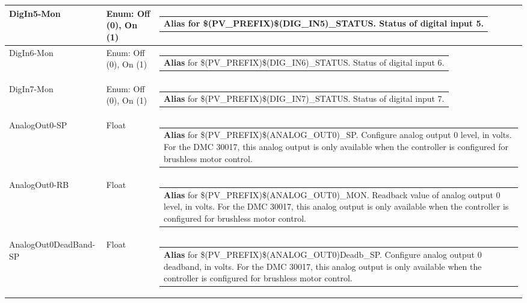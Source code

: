 \documentclass[openany]{article}
\begin{document}
\begin{longtable}{| m{4.5cm} m{2.5cm}  m{8.5cm} |}
        DigIn5-Mon & Enum: Off (0), On (1) & \begin{tabular}{@{}m{6cm}@{}}
                \textbf{\color{blue} Alias} for \$(PV\_PREFIX)\$(DIG\_IN5)\_STATUS. Status of digital input 5.
            \end{tabular} \hypertarget{pv:dig-in-6}{}\\ \hline
        DigIn6-Mon & Enum: Off (0), On (1) & \begin{tabular}{@{}m{6cm}@{}}
                \textbf{\color{blue} Alias} for \$(PV\_PREFIX)\$(DIG\_IN6)\_STATUS. Status of digital input 6.
            \end{tabular} \hypertarget{pv:dig-in-7}{}\\ \hline
        DigIn7-Mon & Enum: Off (0), On (1) & \begin{tabular}{@{}m{6cm}@{}}
                \textbf{\color{blue} Alias} for \$(PV\_PREFIX)\$(DIG\_IN7)\_STATUS. Status of digital input 7.
            \end{tabular} \hypertarget{pv:analog-out-0}{}\\ \hline
        AnalogOut0-SP & Float & \begin{tabular}{@{}m{6cm}@{}}
                \textbf{\color{blue} Alias} for \$(PV\_PREFIX)\$(ANALOG\_OUT0)\_SP. Configure analog output 0 level, in volts. For the DMC 30017, this analog output is only available when the controller is configured for brushless motor control.
            \end{tabular} \hypertarget{}{}\\ \hline
        AnalogOut0-RB & Float & \begin{tabular}{@{}m{6cm}@{}}
                \textbf{\color{blue} Alias} for \$(PV\_PREFIX)\$(ANALOG\_OUT0)\_MON. Readback value of analog output 0 level, in volts. For the DMC 30017, this analog output is only available when the controller is configured for brushless motor control.
            \end{tabular} \hypertarget{pv:analog-out-0-dead-band}{}\\ \hline
        AnalogOut0DeadBand-SP & Float & \begin{tabular}{@{}m{6cm}@{}}
                \textbf{\color{blue} Alias} for \$(PV\_PREFIX)\$(ANALOG\_OUT0)Deadb\_SP. Configure analog output 0 deadband, in volts. For the DMC 30017, this analog output is only available when the controller is configured for brushless motor control.
            \end{tabular} \hypertarget{}{}\\ \hline

\end{longtable}
\end{document}
